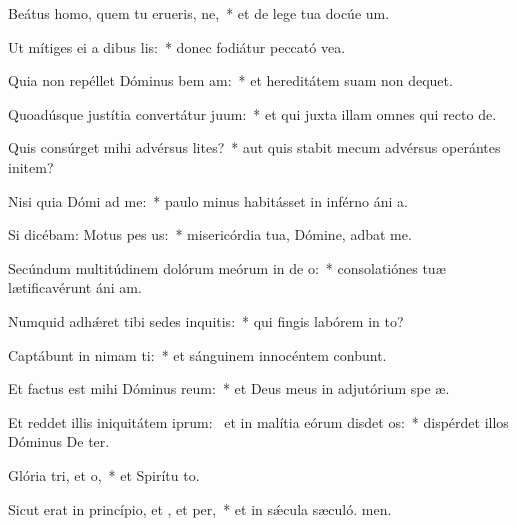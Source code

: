 \item Beátus homo, quem tu erueris, ne,~* et de lege tua docúe um.
\item Ut mítiges ei a dibus lis:~* donec fodiátur peccató vea.
\item Quia non repéllet Dóminus bem am:~* et hereditátem suam non dequet.
\item Quoadúsque justítia convertátur  juum:~* et qui juxta illam omnes qui recto  de.
\item Quis consúrget mihi advérsus lites?~* aut quis stabit mecum advérsus operántes initem?
\item Nisi quia Dómi ad me:~* paulo minus habitásset in inférno áni a.
\item Si dicébam: Motus  pes us:~* misericórdia tua, Dómine, adbat me.
\item Secúndum multitúdinem dolórum meórum in de o:~* consolatiónes tuæ lætificavérunt áni am.
\item Numquid adhǽret tibi sedes inquitis:~* qui fingis labórem in to?
\item Captábunt in nimam ti:~* et sánguinem innocéntem conbunt.
\item Et factus est mihi Dóminus  reum:~* et Deus meus in adjutórium spe æ.
\item Et reddet illis iniquitátem iprum:~\pscross{} et in malítia eórum disdet os:~* dispérdet illos Dóminus De ter.
\item Glória tri, et o,~* et Spirítu to.
\item Sicut erat in princípio, et , et per,~* et in sǽcula sæculó. men.
